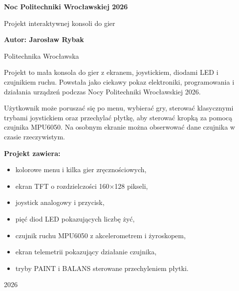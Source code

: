 \documentclass[12pt,a4paper]{article}
\begin{document}
\begin{titlepage}
    \centering
    \vspace*{2.1cm}
    {\Huge\bfseries Noc Politechniki Wrocławskiej 2026\par}
    \vspace{1.8cm}
    {\Large Projekt interaktywnej konsoli do gier\par}
    \vspace{2.2cm}
    {\Large\bfseries Autor: Jarosław Rybak\par}
    \vspace{0.3cm}
    {\large Politechnika Wrocławska\par}
    \vspace{1.8cm}
    \begin{minipage}{0.78\textwidth}
        \centering
        \small
        Projekt to mała konsola do gier z ekranem, joystickiem, diodami LED
        i czujnikiem ruchu. Powstała jako ciekawy pokaz elektroniki,
        programowania i działania urządzeń podczas Nocy Politechniki
        Wrocławskiej 2026.

        \vspace{0.5cm}

        Użytkownik może poruszać się po menu, wybierać gry, sterować
        klasycznymi trybami joystickiem oraz przechylać płytkę, aby
        sterować kropką za pomocą czujnika MPU6050. Na osobnym ekranie
        można obserwować dane czujnika w czasie rzeczywistym.
    \end{minipage}
    \vspace{1.3cm}

    \begin{minipage}{0.78\textwidth}
        \textbf{Projekt zawiera:}
        \begin{itemize}
            \item kolorowe menu i kilka gier zręcznościowych,
            \item ekran TFT o rozdzielczości 160$\times$128 pikseli,
            \item joystick analogowy i przycisk,
            \item pięć diod LED pokazujących liczbę żyć,
            \item czujnik ruchu MPU6050 z akcelerometrem i żyroskopem,
            \item ekran telemetrii pokazujący działanie czujnika,
            \item tryby PAINT i BALANS sterowane przechyleniem płytki.
        \end{itemize}
    \end{minipage}
    \vfill
    {\large 2026\par}
\end{titlepage}
\end{document}

